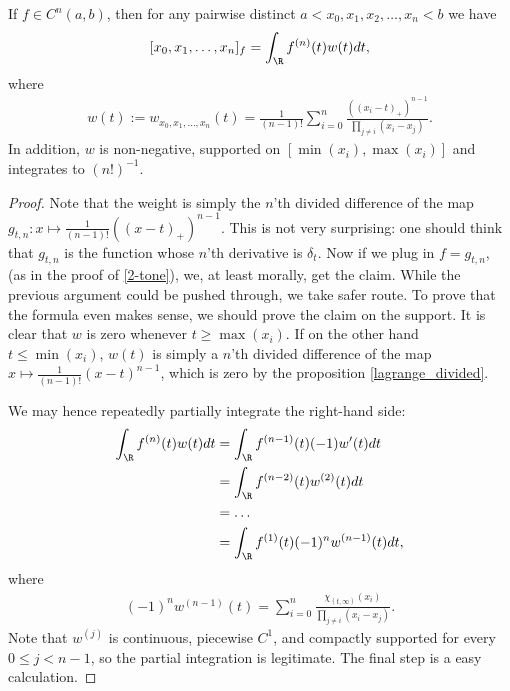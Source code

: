 \begin{lause}\label{peano_theorem}
	If $f \in C^{n}(a, b)$, then for any pairwise distinct $a < x_{0}, x_{1}, x_{2}, \ldots, x_{n} < b$ we have
	\begin{align}\label{peano_identity}
		[x_{0}, x_{1}, \ldots, x_{n}]_{f} = \int_{\R} f^{(n)}(t) w(t) dt,
	\end{align}
	where
	\begin{align}\label{peano_weight}
		w(t) := w_{x_{0}, x_{1}, \ldots, x_{n}}(t) = \frac{1}{(n - 1)!}\sum_{i = 0}^{n} \frac{((x_{i} - t)_{+})^{n - 1}}{\prod_{j \neq i} (x_{i} - x_{j})}.
	\end{align}
	In addition, $w$ is non-negative, supported on $[\min(x_{i}), \max(x_{i})]$ and integrates to $(n!)^{-1}$.
\end{lause}
\begin{proof}
	Note that the weight is simply the $n$'th divided difference of the map $g_{t, n} : x \mapsto \frac{1}{(n - 1)!}((x - t)_{+})^{n - 1}$. This is not very surprising: one should think that $g_{t, n}$ is the function whose $n$'th derivative is $\delta_{t}$. Now if we plug in $f = g_{t, n}$, (as in the proof of \ref{2-tone}), we, at least morally, get the claim. While the previous argument could be pushed through, we take safer route. To prove that the formula even makes sense, we should prove the claim on the support. It is clear that $w$ is zero whenever $t \geq \max(x_{i})$. If on the other hand $t \leq \min(x_{i})$, $w(t)$ is simply a $n$'th divided difference of the map $x \mapsto \frac{1}{(n - 1)!}(x - t)^{n - 1}$, which is zero by the proposition \ref{lagrange_divided}.

	We may hence repeatedly partially integrate the right-hand side:
	\begin{align*}
		 \int_{\R} f^{(n)}(t) w(t) dt &= \int_{\R} f^{(n - 1)}(t) (-1) w'(t) dt \\
		 &= \int_{\R} f^{(n - 2)}(t) w^{(2)}(t) dt \\
		 &= \ldots \\
		 &= \int_{\R} f^{(1)}(t) (-1)^{n} w^{(n - 1)}(t) dt,
	\end{align*}
	where
	\begin{align*}
		(-1)^{n} w^{(n - 1)}(t) = \sum_{i = 0}^{n} \frac{\chi_{(t, \infty)}(x_{i})}{\prod_{j \neq i} (x_{i} - x_{j})}.
	\end{align*}
	Note that $w^{(j)}$ is continuous, piecewise $C^{1}$, and compactly supported for every $0 \leq j < n - 1$, so the partial integration is legitimate. The final step is a easy calculation.


\end{proof}
